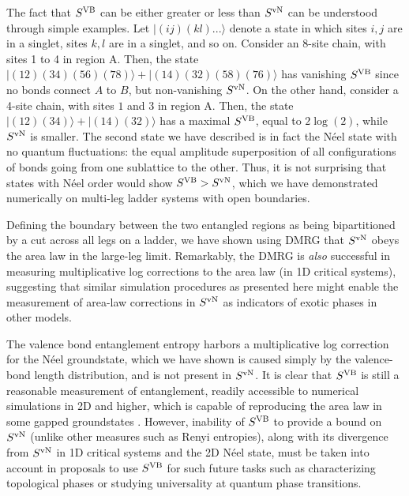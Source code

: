 \documentclass[prl,aps,twocolumn,floatfix,amsmath,amssymb,superscriptaddress,tightenlines]{revtex4}
\begin{document}
The fact  that $S^{\rm VB}$ can be either greater or less than $S^{ \rm
vN}$ can be understood through simple examples. Let $|(ij)(kl)...\rangle$
denote a state in which sites $i,j$ are in a singlet, sites $k,l$ are in a
singlet, and so on.  Consider an 8-site chain, with sites 1 to 4 in region
A. Then, the state $|(12)(34)(56)(78)\rangle+|(14)(32)(58)(76)\rangle$ has
vanishing $S^{\rm VB}$ since no bonds connect $A$ to $B$, but
non-vanishing $S^{ \rm vN}$.  On the other hand, consider a 4-site chain,
with sites $1$ and $3$ in region A. Then, the state
$|(12)(34)\rangle+|(14)(32)\rangle$ has a maximal $S^{\rm VB}$, equal to
$2\log(2)$, while $S^{ \rm vN}$ is smaller.  The second state we have
described is in fact the N\'eel state with no quantum fluctuations: the
equal amplitude superposition of all configurations of bonds going from
one sublattice to the other.  
Thus, it is not surprising that states with N\'eel order would show $S^{\rm VB} > S^{ \rm vN}$,
which we have demonstrated numerically on multi-leg ladder systems with open boundaries.


Defining the boundary between the two entangled regions as being bipartitioned by a cut across all legs
on a ladder, we have shown using DMRG that $S^{ \rm vN}$ obeys the area law in the large-leg limit.   
Remarkably, the DMRG is {\it also} successful in measuring multiplicative log corrections to the area law (in 1D critical systems), suggesting that similar simulation procedures as presented here might enable the measurement of area-law corrections in $S^{\rm vN}$ as indicators of exotic phases in other models.

The valence bond entanglement entropy harbors a multiplicative log correction \cite{Alet,Chh} for the N\'eel groundstate, which we have shown is caused simply by the valence-bond length distribution, and is not present in $S^{\rm vN}$.  It is clear that $S^{\rm VB}$ is still a reasonable measurement of entanglement, readily accessible to numerical simulations in 2D and higher, which is capable of reproducing the area law in some gapped groundstates \cite{Alet,Chh}.  However, inability of  $S^{\rm VB}$ to provide a bound on 
$S^{\rm vN}$ (unlike other measures such as Renyi entropies), along with its divergence from $S^{\rm vN}$ in 1D critical systems and the 2D N\'eel state, must be taken into account in proposals to use $S^{\rm VB}$ for such future tasks such as characterizing topological phases 
 or studying universality at quantum phase transitions.
\end{document}
